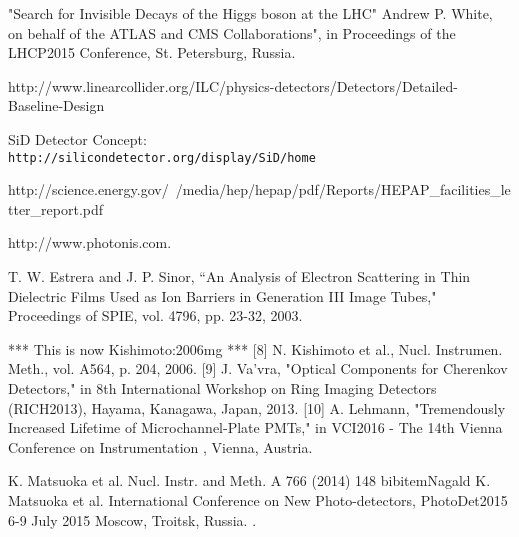 
 "Search for Invisible Decays of the Higgs boson at the LHC"
   Andrew P. White, on behalf of the ATLAS and CMS Collaborations", in Proceedings of the
   LHCP2015 Conference, St. Petersburg, Russia.


 http://www.linearcollider.org/ILC/physics-detectors/Detectors/Detailed-Baseline-Design

 {SiD Detector Concept: \\
  \tt http://silicondetector.org/display/SiD/home}
  
 http://science.energy.gov/~/media/hep/hepap/pdf/Reports/HEPAP_facilities_letter_report.pdf


 http://www.photonis.com.

 T. W. Estrera and J. P. Sinor, ``An Analysis of Electron Scattering in Thin Dielectric Films Used as Ion Barriers in Generation III Image Tubes," Proceedings of SPIE, vol. 4796, pp. 23-32, 2003. 


*** This is now Kishimoto:2006mg ***
[8]
N. Kishimoto et al., Nucl. Instrumen. Meth., vol. A564, p. 204, 2006. 
[9]
J. Va'vra, "Optical Components for Cherenkov Detectors," in 8th International Workshop on Ring Imaging Detectors (RICH2013), Hayama, Kanagawa, Japan, 2013. 
[10] 
A. Lehmann, "Tremendously Increased Lifetime of Microchannel-Plate PMTs," in VCI2016 - The 14th Vienna Conference on Instrumentation , Vienna, Austria.




 K. Matsuoka et al.  Nucl. Instr. and Meth. A 766 (2014) 148 bibitem{Nagald} K. Matsuoka et al.  International Conference on New Photo-detectors, PhotoDet2015 6-9 July 2015 Moscow, Troitsk, Russia.
.
